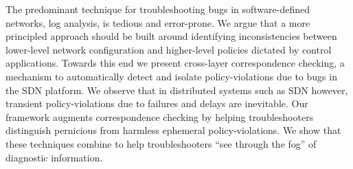 The predominant technique for troubleshooting bugs in software-defined networks,
log analysis, is tedious and error-prone. We argue that a more principled
approach should be built around identifying inconsistencies between lower-level
network configuration and higher-level policies dictated by control
applications. Towards this end we present
cross-layer correspondence checking, a mechanism to automatically detect and
isolate policy-violations due to bugs in the SDN platform. We observe that in
distributed systems such as SDN however,
transient policy-violations due to failures and delays are inevitable.
Our \simulator{} framework augments correspondence checking by helping troubleshooters
distinguish pernicious from harmless ephemeral policy-violations. We
show that these techniques combine to help troubleshooters ``see through the fog'' of
diagnostic information.
